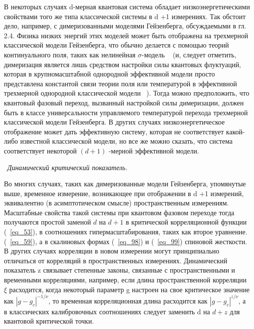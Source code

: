 \documentclass[11pt]{article}
\begin{document}
В некоторых случаях d-мерная квантовая система обладает низкоэнергетическими свойствами того же типа классической системы в d +1 измерениях. Так обстоит дело, например, с димеризованными моделями Гейзенберга, обсуждаемыми в гл. 2.4. Физика низких энергий этих моделей может быть отображена на трехмерной классической модели Гейзенберга, что обычно делается с помощью теорий континуального поля, таких как нелинейная $\sigma$-модель ~\cite{prb_39_2344, prb_49_11919} (и, следует отметить, димеризация является лишь средством настройки силы квантовых флуктуаций, которая в крупномасштабной однородной эффективной модели просто представлена ​​константой связи теории поля или температурой в эффективной трехмерной однородной классической модели ~\cite{pss_241_2118}). Тогда можно предположить, что квантовый фазовый переход, вызванный настройкой силы димеризации, должен быть в классе универсальности управляемого температурой перехода трехмерной классической модели Гейзенберга. В других случаях низкоэнергетическое отображение может дать эффективную систему, которая не соответствует какой-либо известной классической модели, но все же можно сказать, что система соответствует некоторой $(d + 1)$ -мерной эффективной модели.

~\emph{Динамический критический показатель.}

Во многих случаях, таких как димеризованные модели Гейзенберга, упомянутые выше, временное измерение, возникающее при отображении в d +1 измерений, эквивалентно (в асимптотическом смысле) пространственным измерениям. Масштабные свойства такой системы при квантовом фазовом переходе тогда получаются простой заменой $d$ на $d + 1$ в критической корреляционной функции (~\ref{eq_53}), в соотношениях гипермасштабирования, таких как второе уравнение. (~\ref{eq_59}), а в скалиновых формах (~\ref{eq_98}) и (~\ref{eq_99}) спиновой жесткости. В других случаях корреляции в новом измерении могут принципиально отличаться от корреляций в пространственных измерениях. Динамический показатель z связывает степенные законы, связанные с пространственными и временными корреляциями, например, если длина пространственной корреляции $\xi$ расходится, когда некоторый параметр g настроен на свое критическое значение как $| g - g_c |^{ −1 / \nu}$, то временная корреляционная длина расходится как $| g - g_c |^{ z / \nu}$, а в классических калибровочных соотношениях следует заменить d на $d + z$ для квантовой критической точки.
\end{document}
